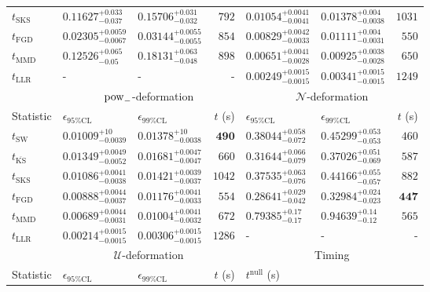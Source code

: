\begin{tabular}{l|llr|llr}
	$t_{\mathrm{SKS}}$ & $0.11627_{-0.037}^{+0.033}$ & $0.15706_{-0.032}^{+0.031}$ & $792$ & $0.01054_{-0.0041}^{+0.0041}$ & $0.01378_{-0.0038}^{+0.004}$ & $1031$ \\
	$t_{\mathrm{FGD}}$ & ${\mathbf{0.02305_{-0.0067}^{+0.0059}}}$ & ${\mathbf{0.03144_{-0.0055}^{+0.0055}}}$ & $854$ & $0.00829_{-0.0033}^{+0.0042}$ & $0.01111_{-0.0031}^{+0.004}$ & $550$ \\
	$t_{\mathrm{MMD}}$ & $0.12526_{-0.05}^{+0.065}$ & $0.18131_{-0.048}^{+0.063}$ & $898$ & ${\mathbf{0.00651_{-0.0028}^{+0.0041}}}$ & ${\mathbf{0.00925_{-0.0028}^{+0.0038}}}$ & $650$ \\
	$t_{\mathrm{LLR}}$ & - & - & - & $0.00249_{-0.0015}^{+0.0015}$ & $0.00341_{-0.0015}^{+0.0015}$ & $1249$ \\
	\toprule
	\multicolumn{1}{c}{} & \multicolumn{3}{c}{$\rm{pow}_{-}$-deformation} & \multicolumn{3}{c}{$\mathcal{N}$-deformation} \\
	Statistic & $\epsilon_{95\%\mathrm{CL}}$ & $\epsilon_{99\%\mathrm{CL}}$ & $t$ (s) & $\epsilon_{95\%\mathrm{CL}}$ & $\epsilon_{99\%\mathrm{CL}}$ & $t$ (s) \\
	\midrule
	$t_{\mathrm{SW}}$ & $0.01009_{-0.0039}^{+10}$ & $0.01378_{-0.0038}^{+10}$ & ${\mathbf{490}}$ & $0.38044_{-0.072}^{+0.058}$ & $0.45299_{-0.053}^{+0.053}$ & $460$ \\
	$t_{\overline{\mathrm{KS}}}$ & $0.01349_{-0.0052}^{+0.0049}$ & $0.01681_{-0.0047}^{+0.0047}$ & $660$ & $0.31644_{-0.079}^{+0.066}$ & $0.37026_{-0.069}^{+0.051}$ & $587$ \\
	$t_{\mathrm{SKS}}$ & $0.01086_{-0.0038}^{+0.0041}$ & $0.01421_{-0.0037}^{+0.0039}$ & $1042$ & $0.37535_{-0.076}^{+0.063}$ & $0.44166_{-0.057}^{+0.055}$ & $882$ \\
	$t_{\mathrm{FGD}}$ & $0.00888_{-0.0037}^{+0.0044}$ & $0.01176_{-0.0033}^{+0.0041}$ & $554$ & ${\mathbf{0.28641_{-0.042}^{+0.029}}}$ & ${\mathbf{0.32984_{-0.023}^{+0.024}}}$ & ${\mathbf{447}}$ \\
	$t_{\mathrm{MMD}}$ & ${\mathbf{0.00689_{-0.0031}^{+0.0044}}}$ & ${\mathbf{0.01004_{-0.0032}^{+0.0041}}}$ & $672$ & $0.79385_{-0.17}^{+0.17}$ & $0.94639_{-0.12}^{+0.14}$ & $565$ \\
	$t_{\mathrm{LLR}}$ & $0.00214_{-0.0015}^{+0.0015}$ & $0.00306_{-0.0015}^{+0.0015}$ & $1286$ & - & - & - \\
	\toprule
	\multicolumn{1}{c}{} & \multicolumn{3}{c}{$\mathcal{U}$-deformation} & \multicolumn{3}{c}{Timing} \\
	Statistic & $\epsilon_{95\%\mathrm{CL}}$ & $\epsilon_{99\%\mathrm{CL}}$ & $t$ (s) & $t^{\mathrm{null}}$ (s) \\

\end{tabular}
